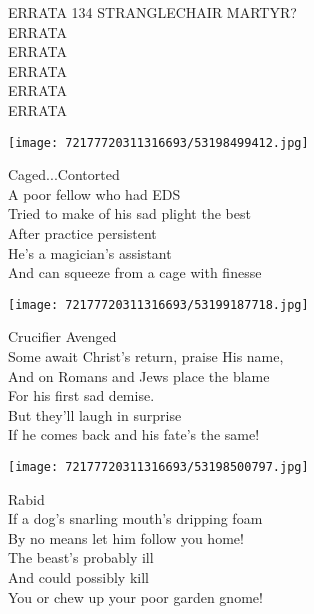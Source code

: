 \documentclass[10pt,letterpaper]{article}
\begin{document}
\begin{center}
ERRATA 134 STRANGLECHAIR MARTYR?\\
\vskip 0.2in
ERRATA\\
ERRATA\\
ERRATA\\
ERRATA\\
ERRATA\\
\end{center}
\pagebreak

\begin{center}\texttt{[image: 72177720311316693/53198499412.jpg]}
\end{center}
\begin{center}
Caged...Contorted\\
\vskip 0.2in
A poor fellow who had EDS\\
Tried to make of his sad plight the best\\
After practice persistent\\
He's a magician's assistant\\
And can squeeze from a cage with finesse\\
\end{center}
\pagebreak

\begin{center}
\texttt{[image: 72177720311316693/53199187718.jpg]}
\end{center}

\begin{center}
Crucifier Avenged\\
\vskip 0.2in
Some await Christ's return, praise His name,\\
And on Romans and Jews place the blame\\
For his first sad demise.\\
But they'll laugh in surprise\\
If he comes back and his fate's the same!\\
\end{center}
\pagebreak

\begin{center}\texttt{[image: 72177720311316693/53198500797.jpg]}
\end{center}
\begin{center}
Rabid\\
\vskip 0.2in
If a dog's snarling mouth's dripping foam\\
By no means let him follow you home!\\
The beast's probably ill\\
And could possibly kill\\
You or chew up your poor garden gnome!\\
\end{center}
\pagebreak
\end{document}

